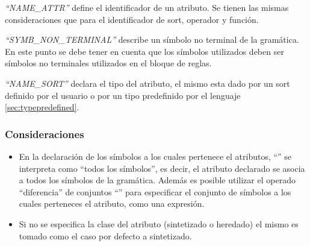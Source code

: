 \textit{``NAME\_ATTR''} define el identificador de un atributo. Se tienen las mismas consideraciones que para el identificador de sort, operador y función.

\textit{``SYMB\_NON\_TERMINAL''} describe un símbolo no terminal de la gramática. En este punto se debe tener en cuenta que los símbolos utilizados deben ser símbolos no terminales utilizados en el bloque de reglas.

\textit{``NAME\_SORT''} declara el tipo del atributo, el mismo esta dado por un sort definido por el usuario o por un tipo predefinido por el lenguaje \ref{sec:typepredefined}.

\subsubsection*{Consideraciones}

\begin{itemize}
\item En la declaración de los símbolos a los cuales pertenece el atributos, ``'' se interpreta como ``todos los símbolos'', es decir, el atributo declarado se asocia a todos los símbolos de la gramática. Además es posible utilizar el operado ``diferencia'' de conjuntos ``\textbtt{-}'' para especificar el conjunto de símbolos a los cuales perteneces el atributo, como una expresión.

\item Si no se especifica la clase del atributo (sintetizado o heredado) el mismo es tomado como el caso por defecto a sintetizado.
\end{itemize}

